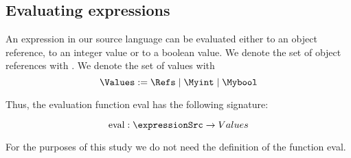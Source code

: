 
\subsection{Evaluating expressions }

An expression in our source language can be evaluated either to an object reference, to an integer value  or to a boolean value. We denote the set of object references with \Refs. We denote the set of values with \Values
$$ 
\Values := \Refs \mid \Myint \mid \Mybool
$$

Thus, the evaluation function \textrm{eval} has the following signature:

$$\textrm{eval}: \expressionSrc \rightarrow Values $$

 
For the purposes of this study we do not need the definition of the function eval.




